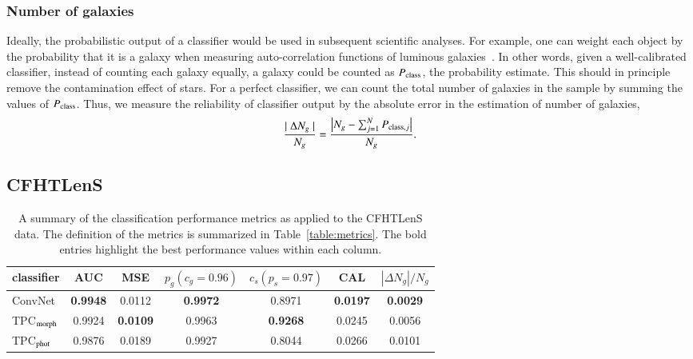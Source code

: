 \documentclass[fleqn,usenatbib]{mnras}
\begin{document}
\subsubsection{Number of galaxies}

Ideally, the probabilistic output of a classifier would be used in subsequent
scientific analyses.
For example, one can weight each object by the probability that it is a galaxy
when measuring auto-correlation functions of luminous
galaxies~\citep{ross2011ameliorating}.
In other words, given a well-calibrated classifier,
instead of counting each galaxy equally, a galaxy could be
counted as $P_{{\mathrm{class}}}$, the probability estimate.
This should in principle remove the contamination effect of stars.
For a perfect classifier, we can count the total number of galaxies in the sample
by summing the values of $P_{{\mathrm{class}}}$.
Thus, we measure the reliability of classifier output by the absolute error
in the estimation of number of galaxies,
\begin{equation}
  \frac{\mid \Delta N_g \mid}{N_g} =
  \frac{\big| N_g - \sum_{j=1}^{N} P_{{\mathrm{class}},j} \big|}{N_g}.
\end{equation}

\subsection{CFHTLenS}
  \label{sec:results_cfht}

\begin{table}
  \caption{
    A summary of the classification performance metrics
    as applied to the CFHTLenS data.
    The definition of the metrics is summarized in Table~\ref{table:metrics}.
    The bold entries highlight the best performance values within each column.
  }
  \centering
  \begin{tabular}{l c c c c c c}
    \hline
    classifier & AUC & MSE & $p_{g}(c_g=0.96)$ & $c_{s}(p_s=0.97)$ & CAL & $ |\Delta N_g|/N_g$ \\
    \hline
    ConvNet                       & \textbf{0.9948} & 0.0112          & \textbf{0.9972} & 0.8971          & \textbf{0.0197}  & \textbf{0.0029} \\
    TPC${}_{{\mathrm{morph}}}$         & 0.9924          & \textbf{0.0109} & 0.9963          & \textbf{0.9268} & 0.0245           & 0.0056 \\
    TPC${}_{{\mathrm{phot}}}$          & 0.9876          & 0.0189          & 0.9927          & 0.8044          & 0.0266           & 0.0101 \\
    \hline
  \end{tabular}
  \label{table:clens_metrics}
\end{table}
\end{document}
